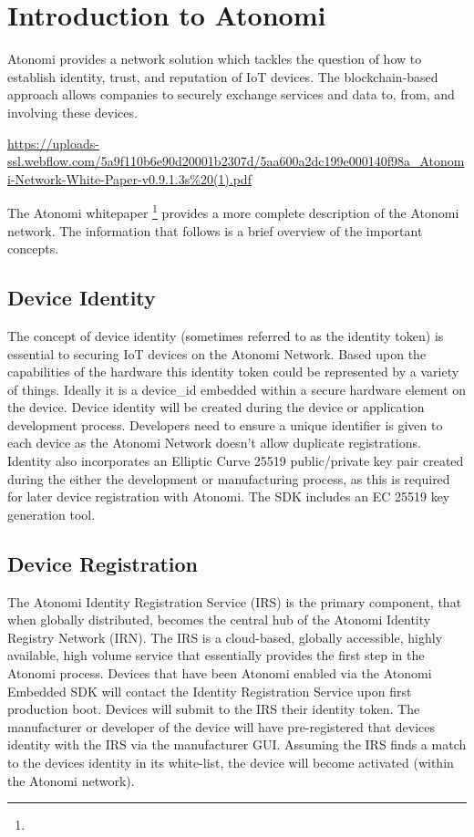 \chapter{Introduction to Atonomi}

Atonomi provides a network solution which tackles the question of how to
establish identity, trust, and reputation of IoT devices. The blockchain-based
approach allows companies to securely exchange services and data to, from, and
involving these devices.

\urldef{\atmiwpurl}\url{https://uploads-ssl.webflow.com/5a9f110b6e90d20001b2307d/5aa600a2dc199e000140f98a_Atonomi-Network-White-Paper-v0.9.1.3s%20(1).pdf}

The Atonomi whitepaper \footnote{\atmiwpurl}
provides a more complete description of the Atonomi network. The information
that follows is a brief overview of the important concepts.


\section{Device Identity}
The concept of device identity (sometimes referred to as the identity token)
is essential to securing IoT devices on the Atonomi Network. Based upon the
capabilities of the hardware this identity token could be represented by a
variety of things. Ideally it is a device_id embedded within a secure hardware
element on the device. Device identity will be created during the device or
application development process. Developers need to ensure a unique identifier
is given to each device as the Atonomi Network doesn't allow duplicate
registrations. Identity also incorporates an Elliptic Curve 25519 public/private
key pair created during the either the development or manufacturing process,
as this is required for later device registration with Atonomi. The SDK includes
an EC 25519 key generation tool.


\section{Device Registration}
The Atonomi Identity Registration Service (IRS) is the primary component,
that when globally distributed, becomes the central hub of the Atonomi Identity
Registry Network (IRN). The IRS is a cloud-based, globally accessible, highly
available, high volume service that essentially provides the first step in the
Atonomi process. Devices that have been Atonomi enabled via the Atonomi Embedded
SDK will contact the Identity Registration Service upon first production boot.
Devices will submit to the IRS their identity token. The manufacturer or
developer of the device will have pre-registered that devices identity with the
IRS via the manufacturer GUI. Assuming the IRS finds a match to the devices
identity in its white-list, the device will become activated (within the
Atonomi network).

